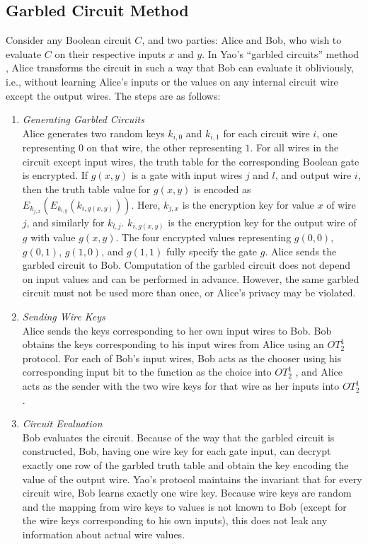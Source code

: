 \subsection{Garbled Circuit Method \label{sub:Garbled-Circuit-Method}}

Consider any Boolean circuit $C$, and two parties: Alice and Bob,
who wish to evaluate $C$ on their respective inputs $x$ and $y$.
In Yao's {}``garbled circuits'' method \cite{Yao86}, Alice transforms
the circuit in such a way that Bob can evaluate it obliviously, i.e.,
without learning Alice's inputs or the values on any internal circuit
wire except the output wires. The steps are as follows: 
\begin{enumerate}
\item \emph{Generating Garbled Circuits} \\
Alice generates two random keys $k_{i,0}$ and $k_{i,1}$ for each
circuit wire $i$, one representing $0$ on that wire, the other representing
$1$. For all wires in the circuit except input wires, the truth table
for the corresponding Boolean gate is encrypted. If $g(x,y)$ is a
gate with input wires $j$ and $l$, and output wire $i$, then the
truth table value for $g(x,y)$ is encoded as $E_{k_{j,x}}\left(E_{k_{l,y}}\left(k_{i,g(x,y)}\right)\right)$.
Here, $k_{j,x}$ is the encryption key for value $x$ of wire $j$,
and similarly for $k_{l,j}$. $k_{i,g(x,y)}$ is the encryption key
for the output wire of $g$ with value $g(x,y)$.  The four encrypted
values representing $g(0,0)$, $g(0,1)$, $g(1,0)$, and $g(1,1)$
fully specify the gate $g$. Alice sends the garbled circuit to Bob.
Computation of the garbled circuit does not depend on input values
and can be performed in advance. However, the same garbled circuit
must not be used more than once, or Alice's privacy may be violated. 
\item \emph{Sending Wire Keys} \\
Alice sends the keys corresponding to her own input wires to Bob.
Bob obtains the keys corresponding to his input wires from Alice using
an $OT_{2}^{1}$ protocol. For each of Bob's input wires, Bob acts
as the chooser using his corresponding input bit to the function as
the choice into $OT_{2}^{1}$ , and Alice acts as the sender with
the two wire keys for that wire as her inputs into $OT_{2}^{1}$ . 
\item \emph{Circuit Evaluation} \\
Bob evaluates the circuit. Because of the way that the garbled circuit
is constructed, Bob, having one wire key for each gate input, can
decrypt exactly one row of the garbled truth table and obtain the
key encoding the value of the output wire. Yao's protocol maintains
the invariant that for every circuit wire, Bob learns exactly one
wire key. Because wire keys are random and the mapping from wire keys
to values is not known to Bob (except for the wire keys corresponding
to his own inputs), this does not leak any information about actual
wire values. 
\end{enumerate}
